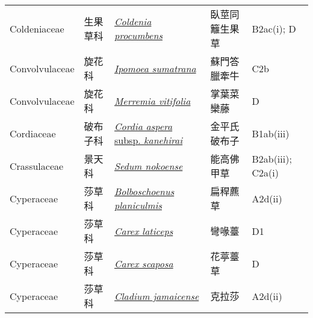 {\begin{longtable}{L{2.5cm}L{2cm}L{5cm}L{2.5cm}L{3cm}}
    Coldeniaceae & 生果草科 & \href{http://www.theplantlist.org/tpl1.1/search?q=Coldenia+procumbens}{\textit{Coldenia procumbens} } & 臥莖同籬生果草 & B2ac(i); D    \\
    Convolvulaceae & 旋花科 & \href{http://www.theplantlist.org/tpl1.1/search?q=Ipomoea+sumatrana}{\textit{Ipomoea sumatrana} } & 蘇門答臘牽牛 & C2b    \\
    Convolvulaceae & 旋花科 & \href{http://www.theplantlist.org/tpl1.1/search?q=Merremia+vitifolia}{\textit{Merremia vitifolia} } & 掌葉菜欒藤 & D    \\
    Cordiaceae & 破布子科 & \href{http://www.theplantlist.org/tpl1.1/search?q=Cordia+aspera+subsp.+kanehirai}{\textit{Cordia aspera} subsp. \textit{kanehirai} } & 金平氏破布子 & B1ab(iii)    \\
    Crassulaceae & 景天科 & \href{http://www.theplantlist.org/tpl1.1/search?q=Sedum+nokoense}{\textit{Sedum nokoense} } & 能高佛甲草 & B2ab(iii); C2a(i)    \\
    Cyperaceae & 莎草科 & \href{http://www.theplantlist.org/tpl1.1/search?q=Bolboschoenus+planiculmis}{\textit{Bolboschoenus planiculmis} } & 扁稈藨草 & A2d(ii)    \\
    Cyperaceae & 莎草科 & \href{http://www.theplantlist.org/tpl1.1/search?q=Carex+laticeps}{\textit{Carex laticeps} } & 彎喙薹 & D1    \\
    Cyperaceae & 莎草科 & \href{http://www.theplantlist.org/tpl1.1/search?q=Carex+scaposa}{\textit{Carex scaposa} } & 花葶薹草 & D    \\
    Cyperaceae & 莎草科 & \href{http://www.theplantlist.org/tpl1.1/search?q=Cladium+jamaicense}{\textit{Cladium jamaicense} } & 克拉莎 & A2d(ii)    \\

\end{longtable}}
